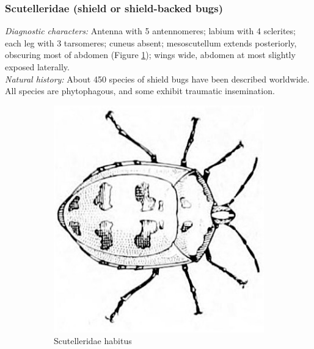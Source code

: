 \documentclass[letterpaper, 11pt]{article}
\begin{document}
\subsubsection{Scutelleridae (shield or shield-backed bugs)}
\noindent{}\textit{Diagnostic characters:} Antenna with 5 antennomeres; labium with 4 sclerites; each leg with 3 tarsomeres; cuneus absent; mesoscutellum extends posteriorly, obscuring most of abdomen (Figure \ref{fig:scutellerid1}); wings wide, abdomen at most slightly exposed laterally.\\

\noindent{}\textit{Natural history:} About 450 species of shield bugs have been described worldwide. All species are phytophagous, and some exhibit traumatic insemination.\\

\begin{figure}[ht!]
 \centering
\begin{subfigure}[ht!]{0.33\textwidth}
 \includegraphics[width=\textwidth]{ScutelleridHabitus}
 \caption{Scutelleridae habitus \citep[][Plate XXXI, Fig. 11]{bhl82061}}
 \label{fig:scutellerid1}
\end{subfigure}
 \qquad 
\begin{subfigure}[ht!]{0.4\textwidth}

\end{subfigure}
\end{figure}
\end{document}
